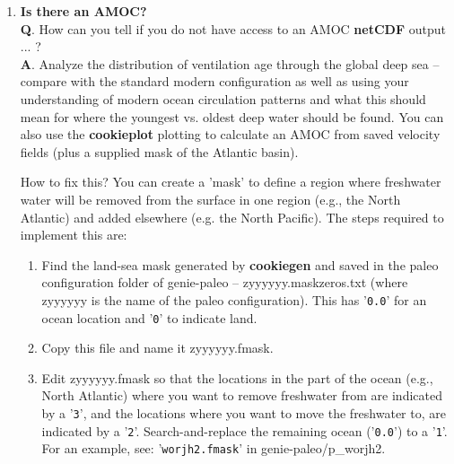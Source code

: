 \begin{enumerate}[noitemsep]

\vspace{2mm}
\item \textbf{Is there an AMOC?}
\vspace{1mm}
\\\textbf{Q}. How can you tell if you do not have access to an AMOC \textbf{netCDF} output ... ?
\\\textbf{A}. Analyze the distribution of ventilation age through the global deep sea -- compare with the standard modern configuration as well as using your understanding of modern ocean circulation patterns and what this should mean for where the youngest vs. oldest deep water should be found. You can also use the \textbf{cookieplot} plotting to calculate an AMOC from saved velocity fields (plus a supplied mask of the Atlantic basin).

\vspace{1mm}
How to fix this? You can create a 'mask' to define a region where freshwater water will be removed from the surface in one region (e.g., the North Atlantic) and added elsewhere (e.g. the North Pacific). The steps required to implement this are:

\begin{enumerate}[noitemsep]

\vspace{1mm}
\item Find the land-sea mask generated by \textbf{cookiegen} and saved in the paleo configuration folder of \textsf{\footnotesize genie-paleo} -- \textsf{\footnotesize zyyyyyy.maskzeros.txt} (where \textsf{\footnotesize zyyyyyy} is the name of the paleo configuration). This has '\texttt{\small 0.0}' for an ocean location and '\texttt{\small 0}' to indicate land.

\vspace{1mm}
\item Copy this file and name it \textsf{\footnotesize zyyyyyy.fmask}.

\vspace{1mm}
\item Edit \textsf{\footnotesize zyyyyyy.fmask} so that the locations in the part of the ocean (e.g., North Atlantic) where you want to remove freshwater from are indicated by a '\texttt{\small 3}', and the locations where you want to move the freshwater to, are indicated by a '\texttt{\small 2}'. Search-and-replace the remaining ocean ('\texttt{\small 0.0}') to a '\texttt{\small 1}'.
\\For an example, see: '\texttt{\small worjh2.fmask}' in \textsf{\footnotesize genie-paleo/p\_worjh2}.


\end{enumerate}
\end{enumerate}
